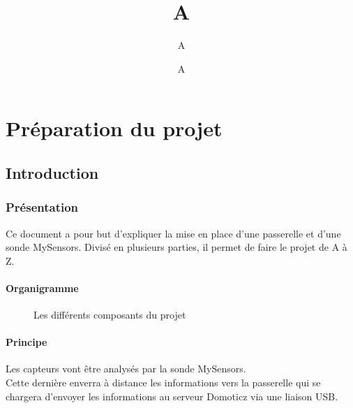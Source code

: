 \documentclass[12pt]{report}
\title{#1}
\author{#2}
\date{#3}
\newcommand{\setHeader}[3]{
\title{#1}
\author{#2}
\date{#3}
\maketitle
}
\begin{document}
\setHeader{A}{A}{A}
\tableofcontents
\setcounter{page}{2}
\part{Préparation du projet}

\chapter{Introduction}

\section{Présentation}

Ce document a pour but d'expliquer la mise en place d'une passerelle et d'une sonde MySensors.
Divisé en plusieurs parties, il permet de faire le projet de A à Z.


\subsection{Organigramme}

\begin{figure}[h]
  \centering
{} 
\caption{Les différents composants du projet}
\end{figure}

  \subsection{Principe}

  Les capteurs vont être analysés par la sonde MySensors.\\
  Cette dernière enverra à distance les informations vers la passerelle qui se chargera d'envoyer les informations au serveur Domoticz via une liaison USB.\\
\end{document}
